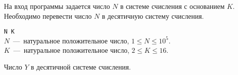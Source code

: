 На вход программы задается число $N$ в системе счисления с основанием $K$. Необходимо перевести число $N$ в десятичную систему счисления.

\InputFile

\noindent
\texttt{N K} \\
$N$~---~натуральное положительное число, $1 \leq N \leq 10^5$. \\
$K$~---~натуральное положительное число, $2 \leq K \leq 16$.

\OutputFile

Число $Y$ в десятичной системе счисления.

\SAMPLES

